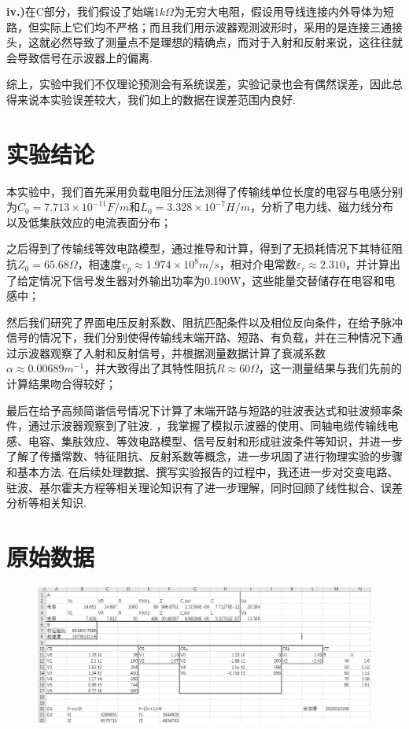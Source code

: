 \documentclass[UTF8]{ctexart}
\begin{document}
\textbf{iv.)}在C部分，我们假设了始端$1k\Omega$为无穷大电阻，假设用导线连接内外导体为短路，但实际上它们均不严格；而且我们用示波器观测波形时，采用的是连接三通接头，这就必然导致了测量点不是理想的精确点，而对于入射和反射来说，这往往就会导致信号在示波器上的偏离.

综上，实验中我们不仅理论预测会有系统误差，实验记录也会有偶然误差，因此总得来说本实验误差较大，我们如上的数据在误差范围内良好.


\section{实验结论}
本实验中，我们首先采用负载电阻分压法测得了传输线单位长度的电容与电感分别为$C_0=7.713\times10^{-11}F/m$和$L_0=3.328\times10^{-7}H/m$，分析了电力线、磁力线分布以及低集肤效应的电流表面分布；\par

之后得到了传输线等效电路模型，通过推导和计算，得到了无损耗情况下其特征阻抗$Z_0=65.68\Omega$，相速度$v_p\approx 1.974\times 10^{8}m/s$，相对介电常数$\varepsilon_r\approx 2.310$，并计算出了给定情况下信号发生器对外输出功率为0.190W，这些能量交替储存在电容和电感中；\par

然后我们研究了界面电压反射系数、阻抗匹配条件以及相位反向条件，在给予脉冲信号的情况下，我们分别使得传输线末端开路、短路、有负载，并在三种情况下通过示波器观察了入射和反射信号，并根据测量数据计算了衰减系数$\alpha\approx 0.00689m^{-1}$，并大致得出了其特性阻抗$R\approx 60\Omega$，这一测量结果与我们先前的计算结果吻合得较好；\par

最后在给予高频简谐信号情况下计算了末端开路与短路的驻波表达式和驻波频率条件，通过示波器观察到了驻波.
，我掌握了模拟示波器的使用、同轴电缆传输线电感、电容、集肤效应、等效电路模型、信号反射和形成驻波条件等知识，并进一步了解了传播常数、特征阻抗、反射系数等概念，进一步巩固了进行物理实验的步骤和基本方法. 在后续处理数据、撰写实验报告的过程中，我还进一步对交变电路、驻波、基尔霍夫方程等相关理论知识有了进一步理解，同时回顾了线性拟合、误差分析等相关知识.
\newpage
\section{原始数据}
\begin{figure}[H]\begin{center}
    \includegraphics[scale=0.7]{data.PNG}
\end{center}\end{figure}
\end{document}
